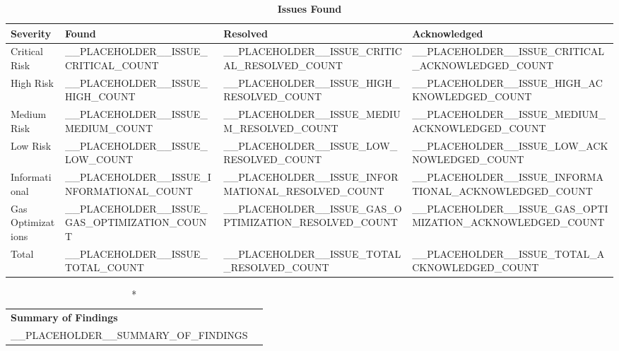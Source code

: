 \begin{table}[H]
  \centering
  \caption*{\textbf{Issues Found}}
  \begin{tabular}{|p{3cm}|>{\centering\arraybackslash}p{1.8cm}|>{\centering\arraybackslash}p{2.2cm}|>{\centering\arraybackslash}p{2.9cm}|}
    \hline
    \textbf{Severity} & \textbf{Found} & \textbf{Resolved} & \textbf{Acknowledged} \\
    \hline
    Critical Risk & __PLACEHOLDER__ISSUE_CRITICAL_COUNT & __PLACEHOLDER__ISSUE_CRITICAL_RESOLVED_COUNT & __PLACEHOLDER__ISSUE_CRITICAL_ACKNOWLEDGED_COUNT \\
    \hline
    High Risk & __PLACEHOLDER__ISSUE_HIGH_COUNT & __PLACEHOLDER__ISSUE_HIGH_RESOLVED_COUNT & __PLACEHOLDER__ISSUE_HIGH_ACKNOWLEDGED_COUNT \\
    \hline
    Medium Risk & __PLACEHOLDER__ISSUE_MEDIUM_COUNT & __PLACEHOLDER__ISSUE_MEDIUM_RESOLVED_COUNT & __PLACEHOLDER__ISSUE_MEDIUM_ACKNOWLEDGED_COUNT \\
    \hline
    Low Risk & __PLACEHOLDER__ISSUE_LOW_COUNT & __PLACEHOLDER__ISSUE_LOW_RESOLVED_COUNT & __PLACEHOLDER__ISSUE_LOW_ACKNOWLEDGED_COUNT \\
    \hline
    Informational & __PLACEHOLDER__ISSUE_INFORMATIONAL_COUNT & __PLACEHOLDER__ISSUE_INFORMATIONAL_RESOLVED_COUNT & __PLACEHOLDER__ISSUE_INFORMATIONAL_ACKNOWLEDGED_COUNT \\
    \hline
    Gas Optimizations & __PLACEHOLDER__ISSUE_GAS_OPTIMIZATION_COUNT & __PLACEHOLDER__ISSUE_GAS_OPTIMIZATION_RESOLVED_COUNT & __PLACEHOLDER__ISSUE_GAS_OPTIMIZATION_ACKNOWLEDGED_COUNT \\
    \hline
    Total & __PLACEHOLDER__ISSUE_TOTAL_COUNT & __PLACEHOLDER__ISSUE_TOTAL_RESOLVED_COUNT & __PLACEHOLDER__ISSUE_TOTAL_ACKNOWLEDGED_COUNT \\
    \hline
  \end{tabular}
\end{table}

\renewcommand{\floatpagefraction}{.5}%
\renewcommand{\textfraction}{.2}%
\renewcommand{\topfraction}{.7}%
\renewcommand{\bottomfraction}{.3}%
\setcounter{topnumber}{2}
\setcounter{bottomnumber}{1}
\setcounter{totalnumber}{3}

\begin{longtable}{|p{12cm}|p{3cm}|}
  \caption*{\textbf{Summary of Findings}}\\
    __PLACEHOLDER__SUMMARY_OF_FINDINGS
\end{longtable}
